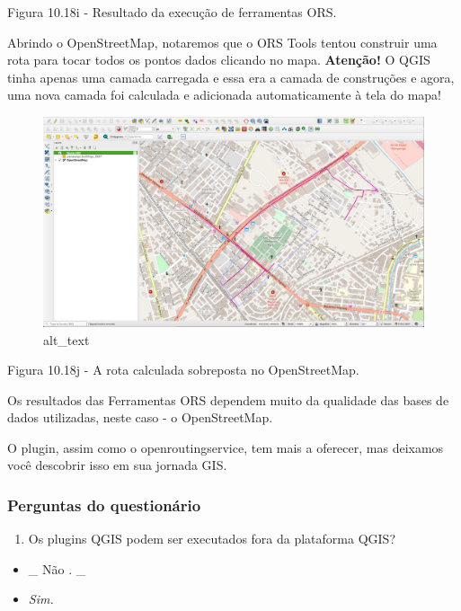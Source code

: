 \documentclass[
]{book}
\providecommand{\tightlist}{%
  \setlength{\itemsep}{0pt}\setlength{\parskip}{0pt}}
\begin{document}
Figura 10.18i - Resultado da execução de ferramentas ORS.

Abrindo o OpenStreetMap, notaremos que o ORS Tools tentou construir uma rota para tocar todos os pontos dados clicando no mapa. \textbf{Atenção!} O QGIS tinha apenas uma camada carregada e essa era a camada de construções e agora, uma nova camada foi calculada e adicionada automaticamente à tela do mapa!

\begin{figure}
\centering
\includegraphics{media/modulo10/fig1018_j.png}
\caption{alt\_text}
\end{figure}

Figura 10.18j - A rota calculada sobreposta no OpenStreetMap.

Os resultados das Ferramentas ORS dependem muito da qualidade das bases de dados utilizadas, neste caso - o OpenStreetMap.

O plugin, assim como o openroutingservice, tem mais a oferecer, mas deixamos você descobrir isso em sua jornada GIS.

\hypertarget{perguntas-do-questionuxe1rio-22}{%
\subsubsection{\texorpdfstring{\textbf{Perguntas do questionário}}{Perguntas do questionário}}\label{perguntas-do-questionuxe1rio-22}}

\begin{enumerate}
\def\labelenumi{\arabic{enumi}.}
\tightlist
\item
  Os plugins QGIS podem ser executados fora da plataforma QGIS?
\end{enumerate}

\begin{itemize}
\tightlist
\item
  \_ { Não }. \_
\item
  \emph{Sim. }
\end{itemize}
\end{document}
